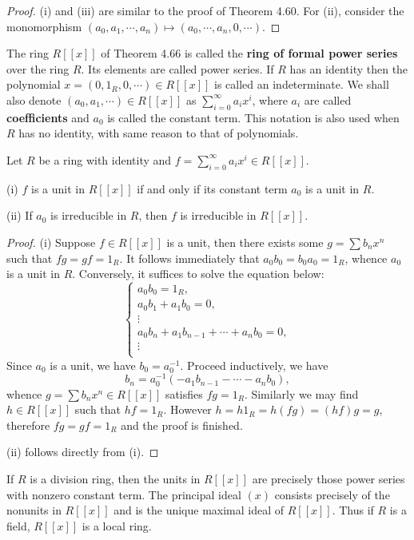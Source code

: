 \begin{proof}
(i) and (iii) are similar to the proof of Theorem 4.60. For (ii), consider the monomorphism $(a_0,a_1,\cdots,a_n)\mapsto(a_0,\cdots,a_n,0,\cdots)$.
\end{proof}
The ring $R[[x]]$ of Theorem 4.66 is called the \textbf{ring of formal power series} over the ring $R$. Its elements are called power series. If $R$ has an identity then the polynomial $x=(0,1_R,0,\cdots)\in R[[x]]$ is called an indeterminate. We shall also denote $(a_0,a_1,\cdots)\in R[[x]]$ as $\sum_{i=0}^\infty a_ix^i$, where $a_i$ are called \textbf{coefficients} and $a_0$ is called the constant term. This notation is also used when $R$ has no identity, with same reason to that of polynomials.
\begin{proposition}
Let $R$ be a ring with identity and $f=\sum_{i=0}^\infty a_ix^i\in R[[x]]$.\par
(i) $f$ is a unit in $R[[x]]$ if and only if its constant term $a_0$ is a unit in $R$.\par
(ii) If $a_0$ is irreducible in $R$, then $f$ is irreducible in $R[[x]]$.
\end{proposition}
\begin{proof}
(i) Suppose $f\in R[[x]]$ is a unit, then there exists some $g=\sum b_nx^n$ such that $fg=gf=1_R$. It follows immediately that $a_0b_0=b_0a_0=1_R$, whence $a_0$ is a unit in $R$. Conversely, it suffices to solve the equation below: 
$$
\begin{cases}
	a_0b_0=1_R,\\
	a_0b_1+a_1b_0=0,\\
	\vdots\\
	a_0b_n+a_1b_{n-1}+\cdots +a_nb_0=0,\\
	\vdots\\
\end{cases}
$$
Since $a_0$ is a unit, we have $b_0=a_0^{-1}$. Proceed inductively, we have $$b_n=a_{0}^{-1}\left( -a_1b_{n-1}-\cdots -a_nb_0 \right) ,$$
whence $g=\sum b_nx^n\in R[[x]]$ satisfies $fg=1_R$. Similarly we may find $h\in R[[x]]$ such that $hf=1_R$. However $h=h1_R=h(fg)=(hf)g=g$, therefore $fg=gf=1_R$ and the proof is finished.\par
(ii) follows directly from (i).
\end{proof}
\begin{corollary}
If $R$ is a division ring, then the units in $R[[x]]$ are precisely those power series with nonzero constant term. The principal ideal $(x)$ consists precisely of the nonunits in $R[[x]]$ and is the unique maximal ideal of $R[[x]]$. Thus if $R$ is a field, $R[[x]]$ is a local ring.
\end{corollary}
